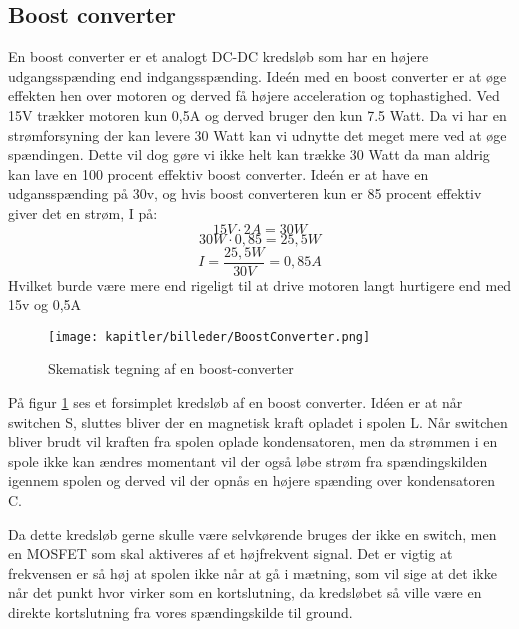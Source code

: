 \newpage
\subsection{Boost converter}
En boost converter er et analogt DC-DC kredsløb som har en højere udgangsspænding end indgangsspænding.
Ideén med en boost converter er at øge effekten hen over motoren og derved få højere acceleration og tophastighed. Ved 15V trækker motoren kun 0,5A og derved bruger den kun 7.5 Watt. Da vi har en strømforsyning der kan levere 30 Watt kan vi udnytte det meget mere ved at øge spændingen. Dette vil dog gøre vi ikke helt kan trække 30 Watt da man aldrig kan lave en 100 procent effektiv boost converter.  Ideén er at have en udgansspænding på 30v, og hvis boost converteren kun er 85 procent effektiv giver det en strøm, I på:
\begin{equation}
15V \cdot 2A = 30 W
\end{equation}
\begin{equation}
30 W \cdot 0,85 = 25,5 W
\end{equation}
\begin{equation}
I = \frac{25,5 W}{30 V} = 0,85A
\end{equation}
Hvilket burde være mere end rigeligt til at drive motoren langt hurtigere end med 15v og 0,5A

\begin{figure}[ht]
    \centering
    \texttt{[image: kapitler/billeder/BoostConverter.png]}
    \caption{Skematisk tegning af en boost-converter}
    \label{fig:boostconvert}
\end{figure}

På figur \ref{fig:boostconvert} ses et forsimplet kredsløb af en boost converter. Idéen er at når switchen S, sluttes bliver der en magnetisk kraft opladet i spolen L. Når switchen bliver brudt vil kraften fra spolen oplade kondensatoren, men da strømmen i en spole ikke kan ændres momentant vil der også løbe strøm fra spændingskilden igennem spolen og derved vil der opnås en højere spænding over kondensatoren C.

Da dette kredsløb gerne skulle være selvkørende bruges der ikke en switch, men en MOSFET som skal aktiveres af et højfrekvent signal. Det er vigtig at frekvensen er så høj at spolen ikke når at gå i mætning, som vil sige at det ikke når det punkt hvor virker som en kortslutning, da kredsløbet så ville være en direkte kortslutning fra vores spændingskilde til ground.

